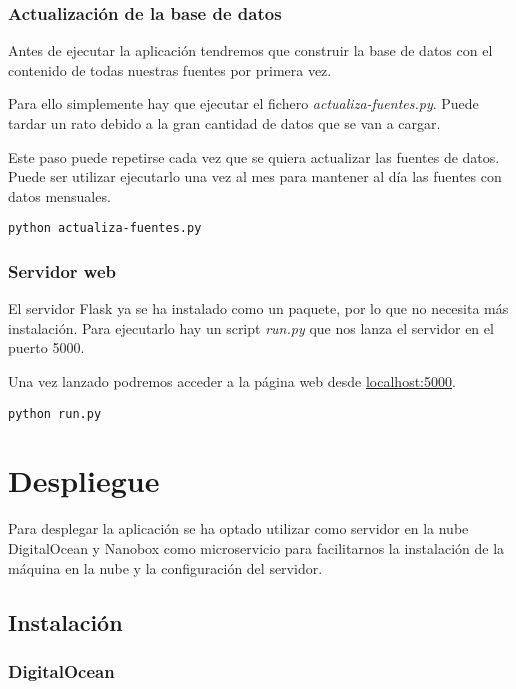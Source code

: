 \subsubsection{Actualización de la base de datos}

Antes de ejecutar la aplicación tendremos que construir la base de datos con el contenido de todas nuestras fuentes por primera vez.

Para ello simplemente hay que ejecutar el fichero \textit{actualiza-fuentes.py}. Puede tardar un rato debido a la gran cantidad de datos que se van a cargar.

Este paso puede repetirse cada vez que se quiera actualizar las fuentes de datos. Puede ser utilizar ejecutarlo una vez al mes para mantener al día las fuentes con datos mensuales.

\begin{lstlisting}
python actualiza-fuentes.py
\end{lstlisting}

\subsubsection{Servidor web}

El servidor Flask ya se ha instalado como un paquete, por lo que no necesita más instalación.
Para ejecutarlo hay un script \textit{run.py} que nos lanza el servidor en el puerto 5000.

Una vez lanzado podremos acceder a la página web desde \href{http://localhost:5000}{localhost:5000}.

\begin{lstlisting}
python run.py
\end{lstlisting}

\section{Despliegue}

Para desplegar la aplicación se ha optado utilizar como servidor en la nube DigitalOcean y Nanobox como microservicio para facilitarnos la instalación de la máquina en la nube y la configuración del servidor.

\subsection{Instalación}

\subsubsection{DigitalOcean}

